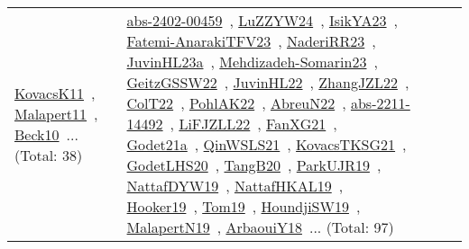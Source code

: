 {\begin{longtable}{lp{3cm}>{\raggedright\arraybackslash}p{6cm}>{\raggedright\arraybackslash}p{6cm}>{\raggedright\arraybackslash}p{8cm}}
\href{../works/KovacsK11.pdf}{KovacsK11}~\cite{KovacsK11}, \href{../works/Malapert11.pdf}{Malapert11}~\cite{Malapert11}, \href{../works/Beck10.pdf}{Beck10}~\cite{Beck10}... (Total: 38) & \href{../works/abs-2402-00459.pdf}{abs-2402-00459}~\cite{abs-2402-00459}, \href{../works/LuZZYW24.pdf}{LuZZYW24}~\cite{LuZZYW24}, \href{../works/IsikYA23.pdf}{IsikYA23}~\cite{IsikYA23}, \href{../works/Fatemi-AnarakiTFV23.pdf}{Fatemi-AnarakiTFV23}~\cite{Fatemi-AnarakiTFV23}, \href{../works/NaderiRR23.pdf}{NaderiRR23}~\cite{NaderiRR23}, \href{../works/JuvinHL23a.pdf}{JuvinHL23a}~\cite{JuvinHL23a}, \href{../works/Mehdizadeh-Somarin23.pdf}{Mehdizadeh-Somarin23}~\cite{Mehdizadeh-Somarin23}, \href{../works/GeitzGSSW22.pdf}{GeitzGSSW22}~\cite{GeitzGSSW22}, \href{../works/JuvinHL22.pdf}{JuvinHL22}~\cite{JuvinHL22}, \href{../works/ZhangJZL22.pdf}{ZhangJZL22}~\cite{ZhangJZL22}, \href{../works/ColT22.pdf}{ColT22}~\cite{ColT22}, \href{../works/PohlAK22.pdf}{PohlAK22}~\cite{PohlAK22}, \href{../works/AbreuN22.pdf}{AbreuN22}~\cite{AbreuN22}, \href{../works/abs-2211-14492.pdf}{abs-2211-14492}~\cite{abs-2211-14492}, \href{../works/LiFJZLL22.pdf}{LiFJZLL22}~\cite{LiFJZLL22}, \href{../works/FanXG21.pdf}{FanXG21}~\cite{FanXG21}, \href{../works/Godet21a.pdf}{Godet21a}~\cite{Godet21a}, \href{../works/QinWSLS21.pdf}{QinWSLS21}~\cite{QinWSLS21}, \href{../works/KovacsTKSG21.pdf}{KovacsTKSG21}~\cite{KovacsTKSG21}, \href{../works/GodetLHS20.pdf}{GodetLHS20}~\cite{GodetLHS20}, \href{../works/TangB20.pdf}{TangB20}~\cite{TangB20}, \href{../works/ParkUJR19.pdf}{ParkUJR19}~\cite{ParkUJR19}, \href{../works/NattafDYW19.pdf}{NattafDYW19}~\cite{NattafDYW19}, \href{../works/NattafHKAL19.pdf}{NattafHKAL19}~\cite{NattafHKAL19}, \href{../works/Hooker19.pdf}{Hooker19}~\cite{Hooker19}, \href{../works/Tom19.pdf}{Tom19}~\cite{Tom19}, \href{../works/HoundjiSW19.pdf}{HoundjiSW19}~\cite{HoundjiSW19}, \href{../works/MalapertN19.pdf}{MalapertN19}~\cite{MalapertN19}, \href{../works/ArbaouiY18.pdf}{ArbaouiY18}~\cite{ArbaouiY18}... (Total: 97)\\
\end{longtable}
}

